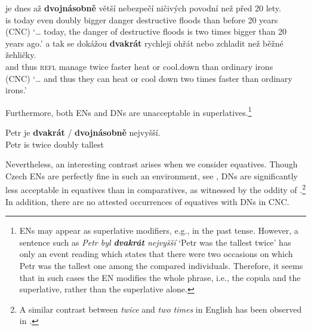 \documentclass[output=paper,
modfonts,
hidelinks,
newtxmath
]{langscibook}
\begin{document}
\ea\label{comparatives-cnc} \ea \gll {\ldots} je dnes až \textbf{dvojnásobně} větší nebezpečí ničivých
povodní než před 20 lety.\\
{} is today even doubly bigger danger destructive floods than before 20
years\\\hfill(CNC)
\glt `{\dots} today, the danger of destructive floods is two times bigger than 20
years ago.'
\ex \gll {\dots} a tak se dokážou \textbf{dvakrát} rychleji ohřát nebo zchladit než
běžné žehličky.\\
{} and thus \textsc{refl} manage twice faster heat or cool.down than ordinary
irons\\\hfill(CNC)
\glt `{\dots} and thus they can heat or cool down two times faster than ordinary
irons.'
\z
\z

\noindent Furthermore, both ENs and DNs are unacceptable in superlatives.\footnote{ENs may appear as superlative modifiers, e.g., in the past tense. However, a sentence such as \textit{Petr byl \textbf{dvakrát} nejvyšší} `Petr was the tallest twice' has only an event reading which states that there were two occasions on which Petr was the tallest one among the compared individuals. Therefore, it seems that in such cases the EN modifies the whole phrase, i.e., the copula and the superlative, rather than the superlative alone.}

\ea *\gll Petr je \textbf{dvakrát} / \textbf{dvojnásobně} nejvyšší.\\
Petr is twice {} doubly tallest\\
\z

\noindent Nevertheless, an interesting contrast arises when we consider equatives. Though Czech ENs are perfectly fine in such an environment, see , DNs are significantly less acceptable in equatives than in comparatives, as witnessed by the oddity of .\footnote{A similar contrast between \textit{twice} and \textit{two times} in English has been observed in \cite{gobeski2011twice}.} In addition, there are no attested occurrences of equatives with DNs in CNC.

\ea\label{dvakrat-comp-eq} 
\z \z
\end{document}
